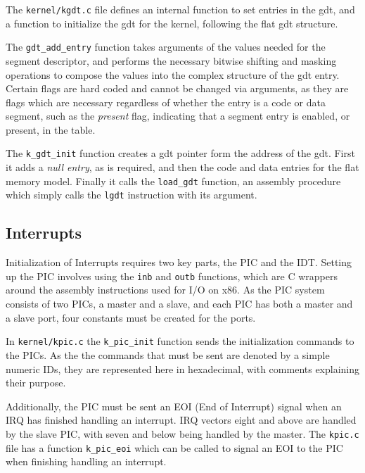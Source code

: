 \documentclass[10pt]{report}
\begin{document}


The \texttt{kernel/kgdt.c} file defines an internal function to set entries in the gdt, and a function to initialize the gdt for the kernel, following the flat gdt structure.



The \texttt{gdt_add_entry} function takes arguments of the values needed for the segment descriptor, and performs the necessary bitwise shifting and masking operations to compose the values into the complex structure of the gdt entry. Certain flags are hard coded and cannot be changed via arguments, as they are flags which are necessary regardless of whether the entry is a code or data segment, such as the \textit{present} flag, indicating that a segment entry is enabled, or present, in the table.

The \texttt{k_gdt_init} function creates a gdt pointer form the address of the gdt. First it adds a \textit{null entry}, as is required\cite{guide2011intel}, and then the code and data entries for the flat memory model. Finally it calls the \texttt{load_gdt} function, an assembly procedure which simply calls the \texttt{lgdt} instruction with its argument.

\subsection{Interrupts}
Initialization of Interrupts requires two key parts, the PIC and the IDT. Setting up the PIC involves using the \texttt{inb} and \texttt{outb} functions, which are C wrappers around the assembly instructions used for I/O on x86. As the PIC system consists of two PICs, a master and a slave, and each PIC has both a master and a slave port, four constants must be created for the ports.



In \texttt{kernel/kpic.c} the \texttt{k_pic_init} function sends the initialization commands to the PICs. As the the commands that must be sent are denoted by a simple numeric IDs, they are represented here in hexadecimal, with comments explaining their purpose.



Additionally, the PIC must be sent an EOI (End of Interrupt) signal when an IRQ has finished handling an interrupt. IRQ vectors eight and above are handled by the slave PIC, with seven and below being handled by the master. The \texttt{kpic.c} file has a function \texttt{k_pic_eoi} which can be called to signal an EOI to the PIC when finishing handling an interrupt.
\end{document}
